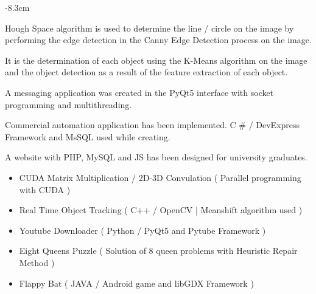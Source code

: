 \documentclass[10pt,a4paper]{altacv}
\begin{document}
\begin{adjustwidth}{}{-8.3cm}
\divider

Hough Space algorithm is used to determine the line / circle on the image by performing the edge detection in the Canny Edge Detection process on the image.


\divider

It is the determination of each object using the K-Means algorithm on the image and the object detection as a result of the feature extraction of each object.


\divider

A messaging application was created in the PyQt5 interface with socket programming and multithreading.

\divider

Commercial automation application has been implemented.
C \# / DevExpress Framework and MsSQL used while creating.

\divider

A website with PHP, MySQL and JS has been designed for university graduates.
\divider

\begin{itemize}
    \item CUDA Matrix Multiplication / 2D-3D Convulation ( Parallel programming with CUDA )
    \item Real Time Object Tracking ( C++ / OpenCV | Meanshift algorithm used )
    \item Youtube Downloader ( Python / PyQt5 and Pytube Framework )
    \item Eight Queens Puzzle ( Solution of 8 queen problems with Heuristic Repair Method )
    \item Flappy Bat ( JAVA / Android game and libGDX Framework )
    
\end{itemize}


\smallskip



\end{adjustwidth}
\end{document}
